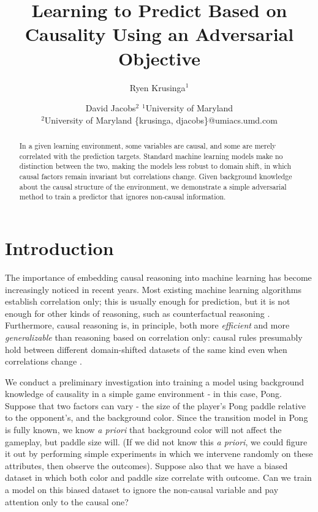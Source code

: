 \documentclass{article}
\title{Learning to Predict Based on Causality Using an Adversarial Objective}
\author{
Ryen Krusinga$^1$
\and
David Jacobs$^2$
\affiliations
$^1$University of Maryland\\
$^2$University of Maryland
\emails
\{krusinga, djacobs\}@umiacs.umd.com
}
\begin{document}
\maketitle

\begin{abstract}
In a given learning environment, some variables are causal, and some are merely correlated with the prediction targets. Standard machine learning models make no distinction between the two, making the models less robust to domain shift, in which causal factors remain invariant but correlations change. Given background knowledge about the causal structure of the environment, we demonstrate a simple adversarial method to train a predictor that ignores non-causal information. %
\end{abstract}



\section{Introduction}
The importance of embedding causal reasoning into machine learning has become increasingly noticed in recent years. Most existing machine learning algorithms establish correlation only; this is usually enough for prediction, but it is not enough for other kinds of reasoning, such as counterfactual reasoning \cite{pearl2018theoretical} \cite{Pearl2009}. Furthermore, causal reasoning is, in principle, both more \emph{efficient} and more \emph{generalizable} than reasoning based on correlation only: causal rules presumably hold between different domain-shifted datasets of the same kind even when correlations change \cite{Bottou2019presentation}. 

We conduct a preliminary investigation into training a model using background knowledge of causality in a simple game environment - in this case, Pong. Suppose that two factors can vary - the size of the player's Pong paddle relative to the opponent's, and the background color. Since the transition model in Pong is fully known, we know \emph{a priori} that background color will not affect the gameplay, but paddle size will. (If we did not know this \emph{a priori}, we could figure it out by performing simple experiments in which we intervene randomly on these attributes, then observe the outcomes). Suppose also that we have a biased dataset in which both color and paddle size correlate with outcome. Can we train a model on this biased dataset to ignore the non-causal variable and pay attention only to the causal one?
\end{document}
